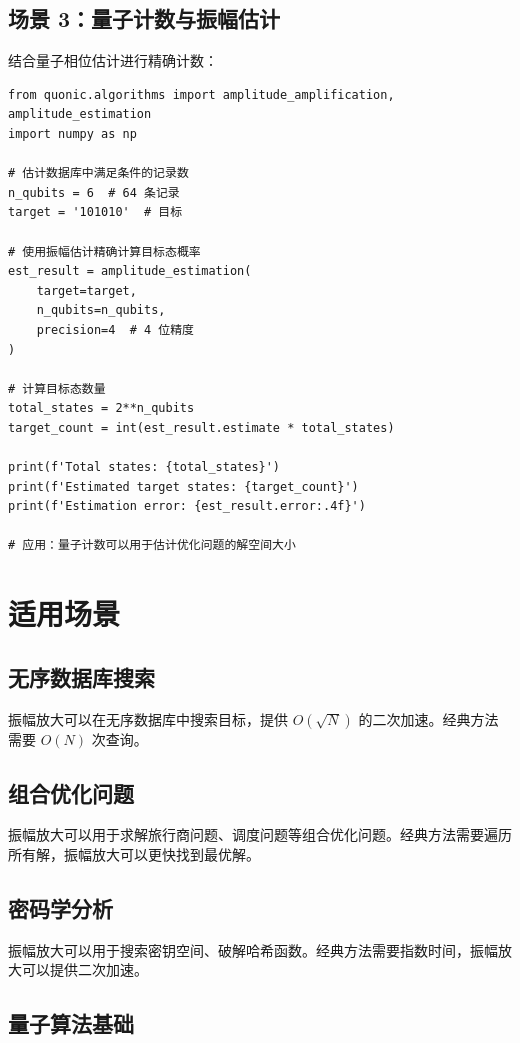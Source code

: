 \documentclass[12pt,a4paper]{article}
\begin{document}
\subsection{场景 3：量子计数与振幅估计}

结合量子相位估计进行精确计数：

\begin{verbatim}
from quonic.algorithms import amplitude_amplification, amplitude_estimation
import numpy as np

# 估计数据库中满足条件的记录数
n_qubits = 6  # 64 条记录
target = '101010'  # 目标

# 使用振幅估计精确计算目标态概率
est_result = amplitude_estimation(
    target=target,
    n_qubits=n_qubits,
    precision=4  # 4 位精度
)

# 计算目标态数量
total_states = 2**n_qubits
target_count = int(est_result.estimate * total_states)

print(f'Total states: {total_states}')
print(f'Estimated target states: {target_count}')
print(f'Estimation error: {est_result.error:.4f}')

# 应用：量子计数可以用于估计优化问题的解空间大小
\end{verbatim}

\section{适用场景}

\subsection{无序数据库搜索}

振幅放大可以在无序数据库中搜索目标，提供 $O(\sqrt{N})$ 的二次加速。经典方法需要 $O(N)$ 次查询。

\subsection{组合优化问题}

振幅放大可以用于求解旅行商问题、调度问题等组合优化问题。经典方法需要遍历所有解，振幅放大可以更快找到最优解。

\subsection{密码学分析}

振幅放大可以用于搜索密钥空间、破解哈希函数。经典方法需要指数时间，振幅放大可以提供二次加速。

\subsection{量子算法基础}
\end{document}
